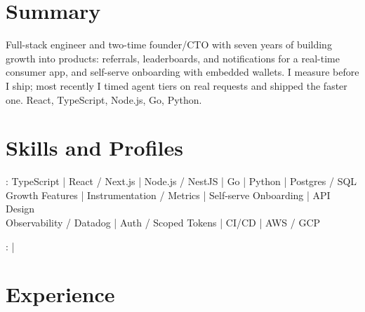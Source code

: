 \documentclass[print]{jack-resume}
\begin{document}
\pagecolor{darkmodeBackground}


\begin{minipage}[t][1cm][t]{.03\textwidth}
    \hfill
\end{minipage}

\section{Summary}
Full-stack engineer and two-time founder/CTO with seven years of building growth into products: referrals, leaderboards, and notifications for a real-time consumer app, and self-serve onboarding with embedded wallets. I measure before I ship; most recently I timed agent tiers on real requests and shipped the faster one. React, TypeScript, Node.js, Go, Python.
\sectionsep

\section{Skills and Profiles}
:
TypeScript \hfill | \hfill
React / Next.js \hfill | \hfill
Node.js / NestJS \hfill | \hfill
Go \hfill | \hfill
Python \hfill | \hfill
Postgres / SQL \\
\hspace{1.0cm} Growth Features \hfill | \hfill
Instrumentation / Metrics \hfill | \hfill
Self-serve Onboarding \hfill | \hfill
API Design \\
\hspace{1.0cm} Observability / Datadog \hfill | \hfill
Auth / Scoped Tokens \hfill | \hfill
CI/CD \hfill | \hfill
AWS / GCP \\

\raggedright{
    :
      \href{https://www.linkedin.com/in/jack-sturtevant/}{ \ExternalLink} |
     \href{https://github.com/jacksturt}{ \ExternalLink}}

\section{Experience}
\end{document}
